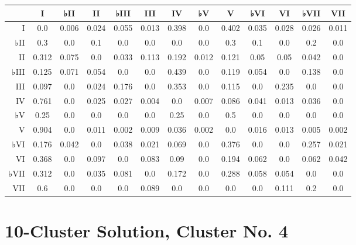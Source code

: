 \begin{table}[htbp]
\begin{minipage}{\linewidth}
\setlength{\tymax}{0.5\linewidth}
\centering
\small
\begin{tabulary}{\textwidth}{@{}RCCCCCCCCCCCC@{}} \toprule
&I&♭II&II&♭III&III&IV&♭V&V&♭VI&VI&♭VII&VII\\
\midrule
I&0.0&0.006&0.024&0.055&0.013&0.398&0.0&0.402&0.035&0.028&0.026&0.011\\
♭II&0.3&0.0&0.1&0.0&0.0&0.0&0.0&0.3&0.1&0.0&0.2&0.0\\
II&0.312&0.075&0.0&0.033&0.113&0.192&0.012&0.121&0.05&0.05&0.042&0.0\\
♭III&0.125&0.071&0.054&0.0&0.0&0.439&0.0&0.119&0.054&0.0&0.138&0.0\\
III&0.097&0.0&0.024&0.176&0.0&0.353&0.0&0.115&0.0&0.235&0.0&0.0\\
IV&0.761&0.0&0.025&0.027&0.004&0.0&0.007&0.086&0.041&0.013&0.036&0.0\\
♭V&0.25&0.0&0.0&0.0&0.0&0.25&0.0&0.5&0.0&0.0&0.0&0.0\\
V&0.904&0.0&0.011&0.002&0.009&0.036&0.002&0.0&0.016&0.013&0.005&0.002\\
♭VI&0.176&0.042&0.0&0.038&0.021&0.069&0.0&0.376&0.0&0.0&0.257&0.021\\
VI&0.368&0.0&0.097&0.0&0.083&0.09&0.0&0.194&0.062&0.0&0.062&0.042\\
♭VII&0.312&0.0&0.035&0.081&0.0&0.172&0.0&0.288&0.058&0.054&0.0&0.0\\
VII&0.6&0.0&0.0&0.0&0.089&0.0&0.0&0.0&0.0&0.111&0.2&0.0\\

\bottomrule

\end{tabulary}
\end{minipage}
\end{table}

\section{10-Cluster Solution, Cluster No. 4}
\label{10-clustersolutionclusterno.4}

